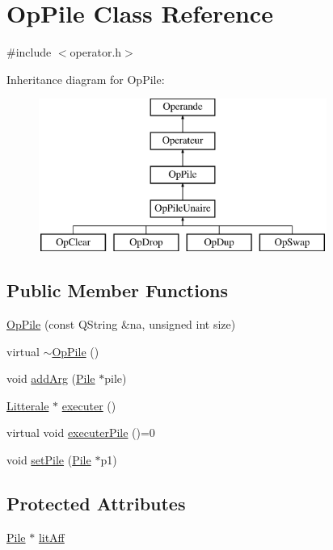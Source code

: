 \hypertarget{class_op_pile}{}\section{Op\+Pile Class Reference}
\label{class_op_pile}


{\ttfamily \#include $<$operator.\+h$>$}

Inheritance diagram for Op\+Pile\+:\begin{figure}[H]
\begin{center}
\leavevmode
\includegraphics[height=5.000000cm]{class_op_pile}
\end{center}
\end{figure}
\subsection*{Public Member Functions}
\begin{DoxyCompactItemize}
\item 
\hyperlink{class_op_pile_abeb5537a96ae74f0a5e1fdfb4da0dd92}{Op\+Pile} (const Q\+String \&na, unsigned int size)
\item 
virtual \hyperlink{class_op_pile_aaae1a74325c449101411ab6b30715c59}{$\sim$\+Op\+Pile} ()
\item 
void \hyperlink{class_op_pile_ac05c50b3c226d57dbb866442ab8fd5e3}{add\+Arg} (\hyperlink{class_pile}{Pile} $\ast$pile)
\item 
\hyperlink{class_litterale}{Litterale} $\ast$ \hyperlink{class_op_pile_a02b47fa3b5f7399a09681c80353024e0}{executer} ()
\item 
virtual void \hyperlink{class_op_pile_a57de213f1b5281de1c37b83ecd8b0cd7}{executer\+Pile} ()=0
\item 
void \hyperlink{class_op_pile_ac67eb5ad0445529cfee741b1f71b0851}{set\+Pile} (\hyperlink{class_pile}{Pile} $\ast$p1)
\end{DoxyCompactItemize}
\subsection*{Protected Attributes}
\begin{DoxyCompactItemize}
\item 
\hyperlink{class_pile}{Pile} $\ast$ \hyperlink{class_op_pile_a702ec066d54bdb84b9980a1343c7f5f4}{lit\+Aff}
\end{DoxyCompactItemize}


